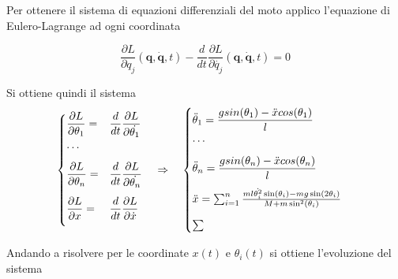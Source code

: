 \documentclass[a4paper, 12pt]{article}
\begin{document}
Per ottenere il sistema di equazioni differenziali del moto 
applico l'equazione di Eulero-Lagrange ad ogni coordinata

\[
\frac{{\partial L}}{{\partial q_j}}\left(\textbf{q}, \dot{\textbf{q}}, t\right) - \frac{{d}}{{dt}} \frac{{\partial L}}
{{\partial \dot{q_j}}}\left(\textbf{q}, \dot{\textbf{q}}, t\right) = 0 
\]

Si ottiene quindi il sistema
\[
\begin{cases}
     \dfrac{\partial L}{\partial \theta_1} =& \dfrac{d}{dt}\dfrac{\partial L}{\partial \dot{\theta_1}} \\
     \vspace{.3cm}
    \ldots \\
    \vspace{.3cm}
    \dfrac{\partial L}{\partial \theta_n} =& \dfrac{d}{dt}\dfrac{\partial L}{\partial \dot{\theta_n}} \\
    \vspace{.3cm}
    \dfrac{\partial L}{\partial x} =& \dfrac{d}{dt}\dfrac{\partial L}{\partial \dot{x}} \\
\end{cases}
\quad \Rightarrow \quad
\begin{cases}
    \ddot{\theta}_1 = \dfrac{gsin(\theta_1)-\ddot{x}cos(\theta_1)}{l} \\
    \vspace{.3cm}
    \ldots \\
    \vspace{.3cm}
    \ddot{\theta}_n = \dfrac{gsin(\theta_n)-\ddot{x}cos(\theta_n)}{l} \\
    \vspace{.3cm}
    \ddot{x} = \sum_{i=1}^{n}  \frac{ml \dot{\theta_i^2 } \sin(\theta_i) -mg \sin (2 \theta_i)}{M+m \sin^2(\theta_i)} \\
    \sum
\end{cases}
\]

Andando a risolvere per le coordinate $x(t)$ e $\theta_i(t)$ si ottiene l'evoluzione del sistema
\end{document}
